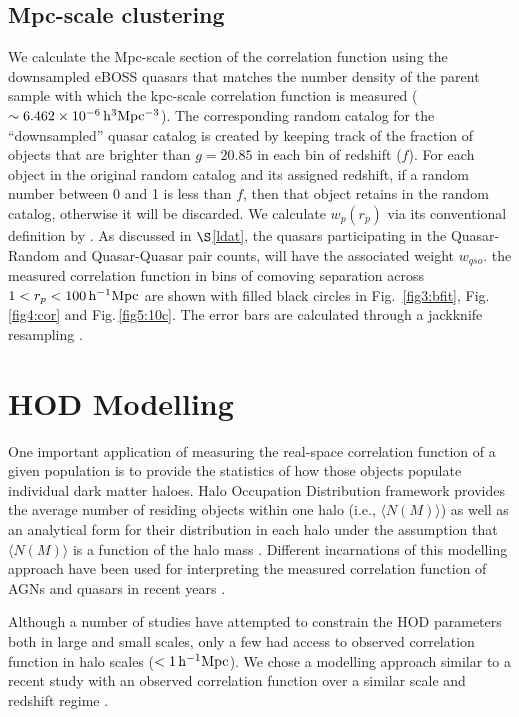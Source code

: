 \documentclass[useAMS,usenatbib]{mn2e}
\begin{document}
\subsection{Mpc-scale clustering}\label{mpcls}

We calculate the Mpc-scale section of the correlation function using the 
downsampled eBOSS quasars that matches the number density of the parent sample 
with which the kpc-scale correlation function is measured ($\sim6.462 \times 10^{-6} \, \rm h^3 Mpc^{-3}$). The corresponding 
random catalog for the ``downsampled'' quasar catalog is created by keeping 
track of the fraction of objects that are brighter than $g=20.85$ in each bin of 
redshift ($f$). For each object in the original random catalog and its 
assigned redshift, if a random number between 0 and 1 is less than $f$, then that object retains in the random catalog,
otherwise it will be discarded. We calculate $w_p(r_p)$  via its conventional definition by \citet{ls93}. 
As discussed in $\S$\ref{ldat}, the quasars participating in the Quasar-Random and Quasar-Quasar pair counts, will have the associated weight $w_{qso}$. 
the measured correlation function in bins of comoving separation across $1<r_p<100 \, \rm h^{-1} Mpc$ are shown with filled black circles in Fig.\, \ref{fig3:bfit}, Fig.\, \ref{fig4:cor} and Fig.\,\ref{fig5:10c}. The error bars are calculated through a jackknife resampling \citep[see, e.g., eqn. 4 of][]{ef15}.  


\section{HOD Modelling}\label{hodmod}

One important application of measuring the real-space correlation function of a 
given population is to provide the statistics of how those objects populate 
individual dark matter haloes. Halo Occupation Distribution framework provides 
the average number of residing objects within one halo (i.e., $\langle 
N(M)\rangle$) as well as an analytical form for 
their distribution in each halo under the assumption that $\langle 
N(M)\rangle$ is a function of the halo mass \citep{pea00,sel00,sc01,bw02}. Different incarnations of this modelling 
approach have been used for interpreting the measured correlation function of 
AGNs and quasars in recent years \citep[e.g., 
][]{po04,coil04,Aba05,coi06,coi07,coi09,mi11,ric12,ko12,kru12,ric13,sh13,Coi16,coi17}.  

Although a number of studies have attempted to constrain the HOD parameters both 
in large and small scales, only a few had access to observed correlation 
function in halo scales ($<1 \, \rm h^{-1} Mpc$). We chose a modelling approach 
similar to a recent study with an observed correlation function over a 
similar scale and redshift regime \citep{ko12}.  
\end{document}
